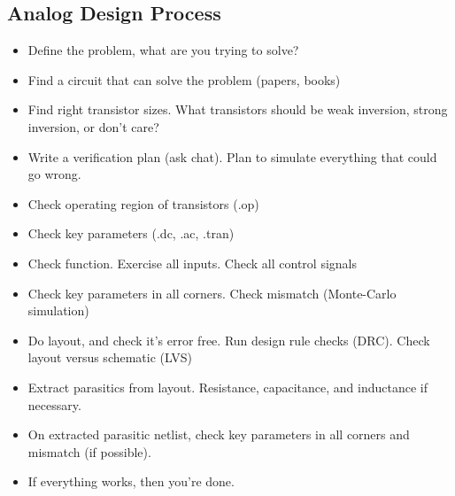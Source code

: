 \begin{Shaded}
\begin{Highlighting}[]
\NormalTok{\textbackslash{}}
     \NormalTok{\textbackslash{}}
     \NormalTok{\textbackslash{}}
     \NormalTok{\textbackslash{}}
     \NormalTok{\textbackslash{}}
     \NormalTok{\textbackslash{}}
     \NormalTok{ \textbackslash{}}
\OtherTok{\textquotesingle{}}\OtherTok{\textquotesingle{}}
\end{Highlighting}
\end{Shaded}

\subsection{Analog Design Process}\label{analog-design-process}

\begin{itemize}
\item
  Define the problem, what are you trying to solve?
\item
  Find a circuit that can solve the problem (papers, books)
\item
  Find right transistor sizes. What transistors should be weak
  inversion, strong inversion, or don't care?
\item
  Write a verification plan (ask chat). Plan to simulate everything that
  could go wrong.
\item
  Check operating region of transistors (.op)
\item
  Check key parameters (.dc, .ac, .tran)
\item
  Check function. Exercise all inputs. Check all control signals
\item
  Check key parameters in all corners. Check mismatch (Monte-Carlo
  simulation)
\item
  Do layout, and check it's error free. Run design rule checks (DRC).
  Check layout versus schematic (LVS)
\item
  Extract parasitics from layout. Resistance, capacitance, and
  inductance if necessary.
\item
  On extracted parasitic netlist, check key parameters in all corners
  and mismatch (if possible).
\item
  If everything works, then you're done.
\end{itemize}

